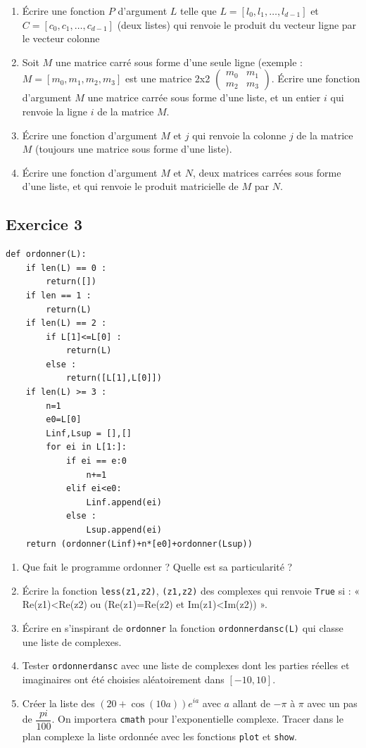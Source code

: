 \documentclass[10pt,fleqn]{article} %
\begin{document}
\begin{multicols}{2}
\begin{enumerate}
\item Écrire une fonction $P$ d'argument $L$ telle que $L = [l_0, l_1,…,l_{d-1}]$ et $C = [c_0,c_1,…,c_{d-1}]$ (deux listes) qui renvoie le produit du vecteur ligne par le vecteur colonne
\item Soit $M$ une matrice carré sous forme d'une seule ligne (exemple : $M = [m_0,m_1,m_2,m_3]$ est une matrice 2x2 $\begin{pmatrix} m_0 & m_1 \\m_2 & m_3 \end{pmatrix}$. Écrire une fonction d'argument $M$ une matrice carrée sous forme d'une liste, et un entier $i$ qui renvoie la ligne $i$ de la matrice $M$.
\item Écrire une fonction d’argument $M$ et $j$ qui renvoie la colonne $j$ de la matrice $M$ (toujours une matrice sous forme d'une liste).
\item Écrire une fonction d'argument $M$ et $N$, deux matrices carrées sous forme d'une liste, et qui renvoie le produit matricielle de $M$ par $N$. 
\end{enumerate}


\subsection*{Exercice 3}
\begin{py}
\begin{lstlisting}
def ordonner(L):
    if len(L) == 0 :
        return([])
    if len == 1 :
        return(L)
    if len(L) == 2 :
        if L[1]<=L[0] :
            return(L)
        else :
            return([L[1],L[0]])
    if len(L) >= 3 :
        n=1
        e0=L[0]
        Linf,Lsup = [],[]
        for ei in L[1:]:
            if ei == e:0
                n+=1
            elif ei<e0:
                Linf.append(ei)
            else :
                Lsup.append(ei)
    return (ordonner(Linf)+n*[e0]+ordonner(Lsup))
\end{lstlisting}
\end{py}


\begin{enumerate}
\item Que fait le programme ordonner ? Quelle est sa particularité ? 
\item Écrire la fonction \texttt{less(z1,z2)}, \texttt{(z1,z2)} des complexes qui renvoie \texttt{True} si : 
« Re(z1)<Re(z2) ou (Re(z1)=Re(z2) et Im(z1)<Im(z2)) ».
\item Écrire en s’inspirant de \texttt{ordonner} la fonction \texttt{ordonnerdansc(L)} qui classe une liste de complexes.
\item Tester \texttt{ordonnerdansc} avec une liste de complexes dont les parties réelles et imaginaires ont été choisies aléatoirement dans $[-10,10]$.
\item Créer la liste des $(20+\cos(10a))e^{ia}$ avec $a$ allant de $-\pi$ à $\pi$ avec un pas de $\dfrac{pi}{100}$. On importera \texttt{cmath} pour l’exponentielle complexe. Tracer dans le plan complexe la liste ordonnée avec les fonctions \texttt{plot} et \texttt{show}.
\end{enumerate}


\end{multicols}
\end{document}
